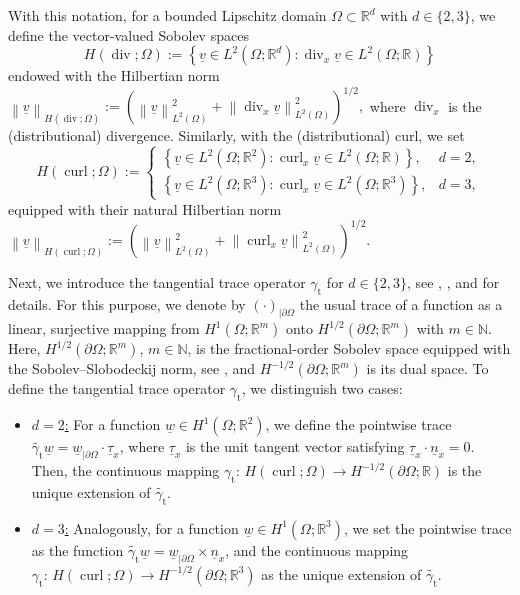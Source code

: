 \documentclass[a4paper,11pt]{article}
\newcommand{\N}{\mathbb N}
\newcommand{\R}{\mathbb R}
\newcommand{\cu}{\operatorname{curl}}
\newcommand{\di}{\operatorname{div}}
\newcommand{\trt}{\gamma_\mathrm{t}}
\renewcommand{\vec}[1]{\underline{#1}}
\newcommand{\norm}[1]{{\left\lVert{#1}\right\rVert}}
\begin{document}
	With this notation, for a bounded Lipschitz domain $\Omega \subset \R^d$ with $d \in \{2,3\}$, we define the vector-valued Sobolev spaces
	\begin{equation*}
		H(\di;\Omega) := \left\{ \vec v \in L^2(\Omega;\R^d) : \di_x \vec v \in L^2(\Omega;\R) \right\}
	\end{equation*}
	endowed with the Hilbertian norm $\norm{\vec v}_{H(\di;\Omega)} := \left(  \norm{\vec v}_{L^2(\Omega)}^2 + \norm{\di_x \vec v}_{L^2(\Omega)}^2 \right)^{1/2},$ where $\di_x$ is the (distributional) divergence. Similarly, with the (distributional) curl, we set
	\begin{equation*}
		H(\cu;\Omega) := \begin{cases}
			\left\{ \vec v \in L^2(\Omega;\R^2) :  \cu_x \vec v \in L^2(\Omega; \R) \right\}, & d=2, \\
			\left\{ \vec v \in L^2(\Omega;\R^3) :  \cu_x \vec v \in L^2(\Omega; \R^3) \right\}, & d=3,
		\end{cases}
	\end{equation*}
	equipped with their natural Hilbertian norm $\norm{\vec v}_{H(\cu;\Omega)} := \left(  \norm{\vec v}_{L^2(\Omega)}^2 + \norm{\cu_x \vec v}_{L^2(\Omega)}^2 \right)^{1/2}.$

	Next, we introduce the tangential trace operator $\trt$ for $d \in \{2,3\}$, see \cite{Assous2018}, \cite[Section~4.3]{ErnGuermond2020I}, \cite[Theorem~2.11]{GiraultRaviart1986} and \cite[Subsection~3.5.3]{Monk2003} for details. For this purpose, we denote by $(\cdot)_{|\partial \Omega}$ the usual trace of a function as a linear, surjective mapping from $H^1(\Omega;\R^m)$ onto $H^{1/2}(\partial \Omega;\R^m)$ with $m \in \N$. Here, $H^{1/2}(\partial \Omega;\R^m)$, $m \in \N$, is the fractional-order Sobolev space equipped with the Sobolev–Slobodeckij norm, see \cite[Subsection~2.2.2]{ErnGuermond2020I}, and $H^{-1/2}(\partial \Omega;\R^m)$ is its dual space.
	To define the tangential trace operator $\trt$, we distinguish two cases:
	\begin{itemize}
            \item \underline{$d=2$:} For a function $\vec w \in H^1(\Omega;\R^2)$, we define the pointwise trace $\widetilde{\trt} \vec w = \vec w_{|\partial \Omega} \cdot \vec \tau_x$, where $\vec \tau_x $ is the unit tangent vector satisfying $\vec \tau_x \cdot \vec n_x = 0$. Then, the continuous mapping $\trt \colon \, H(\cu;\Omega) \to H^{-1/2}(\partial \Omega;\R)$ is the unique extension of $\widetilde{\trt}.$
            \item \underline{$d=3$:} Analogously, for a function $\vec w \in H^1(\Omega;\R^3)$, we set the pointwise trace as the function $\widetilde{\trt} \vec w = \vec w_{|\partial \Omega} \times \vec n_x$, and the continuous mapping $\trt \colon \, H(\cu;\Omega) \to H^{-1/2}(\partial \Omega;\R^3)$ as the unique extension of $\widetilde{\trt}$.
	\end{itemize}
\end{document}
